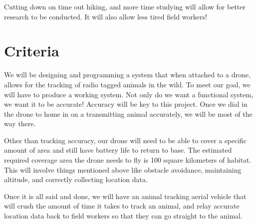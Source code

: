 \documentclass[10pt, draftclsnofoot, onecolumn] {IEEEtran}
\begin{document}
    Cutting down on time out hiking, and more time studying will allow for better research to be conducted. It will also allow less tired field workers!


\section{Criteria}
    We will be designing and programming a system that when attached to a drone, allows for the tracking of radio tagged animals in the wild. To meet our goal, we will have to produce a working system. Not only do we want a functional system, we want it to be accurate! Accuracy will be key to this project. Once we dial in the drone to home in on a transmitting animal accurately, we will be most of the way there.
    
    Other than tracking accuracy, our drone will need to be able to cover a specific amount of area and still have battery life to return to base. The estimated required coverage area the drone needs to fly is 100 square kilometers of habitat. This will involve things mentioned above like obstacle avoidance, maintaining altitude, and correctly collecting location data.
    
    Once it is all said and done, we will have an animal tracking aerial vehicle that will crush the amount of time it takes to track an animal, and relay accurate location data back to field workers so that they can go straight to the animal.
\end{document}
